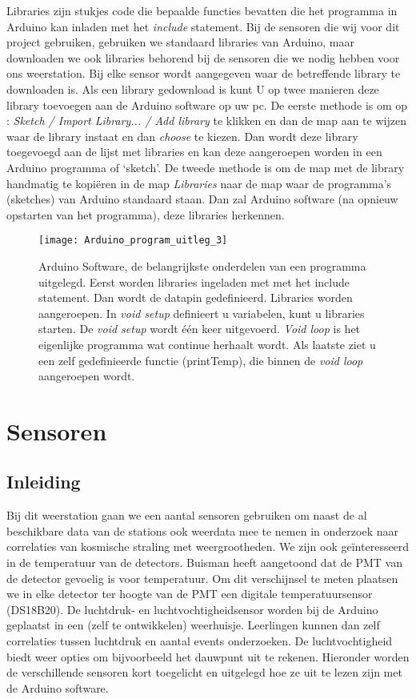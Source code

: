 Libraries zijn stukjes code die bepaalde functies bevatten die het
programma in Arduino kan inladen met het \emph{include} statement. Bij
de sensoren die wij voor dit project gebruiken, gebruiken we standaard
libraries van Arduino, maar downloaden we ook libraries behorend bij de
sensoren die we nodig hebben voor ons weerstation. Bij elke sensor wordt
aangegeven waar de betreffende library te downloaden is. Als een library
gedownload is kunt U op twee manieren deze library toevoegen aan de
Arduino software op uw pc. De eerste methode is om op : \emph{Sketch /
Import Library... / Add library} te klikken en dan de map aan te wijzen
waar de library instaat en dan \emph{choose} te kiezen. Dan wordt deze
library toegevoegd aan de lijst met libraries en kan deze aangeroepen
worden in een Arduino programma of `sketch'. De tweede methode is om de
map met de library handmatig te kopi\"{e}ren in de map \emph{Libraries}
naar de map waar de programma's (sketches) van Arduino standaard staan.
Dan zal Arduino software (na opnieuw opstarten van het programma), deze 
libraries herkennen. 


\begin{figure}
    \centering
    \texttt{[image: Arduino\_program\_uitleg\_3]}
    \caption{Arduino Software, de belangrijkste onderdelen van een 
    programma uitgelegd. Eerst worden libraries ingeladen met 
    met het include statement. Dan wordt de datapin gedefinieerd.
    Libraries worden aangeroepen. In \emph{void setup} definieert u variabelen, 
    kunt u libraries starten. De \emph{void setup} wordt één keer uitgevoerd. 
    \emph{Void loop} is het eigenlijke programma wat continue herhaalt wordt. 
    Als laatste ziet u een zelf gedefinieerde functie (printTemp), die binnen 
    de \emph{void loop} aangeroepen wordt.}
   \label{fig:Arduino_program_uitleg_3}
\end{figure}


\section{Sensoren}

\subsection{Inleiding}

Bij dit weerstation gaan we een aantal sensoren gebruiken om naast de al
beschikbare data van de \hisparc stations ook weerdata mee te nemen in
onderzoek naar correlaties van kosmische straling met weergrootheden. We
zijn ook ge\"{i}nteresseerd in de temperatuur van de detectors.
Buisman \cite{Buisman} heeft aangetoond dat de PMT van de detector gevoelig is
voor temperatuur. Om dit verschijnsel te meten plaatsen we in elke detector 
ter hoogte van de PMT een digitale temperatuursensor (DS18B20). De luchtdruk- 
en luchtvochtigheidsensor worden bij de Arduino geplaatst in een (zelf te
ontwikkelen) weerhuisje. Leerlingen kunnen dan zelf correlaties tussen
luchtdruk en aantal events onderzoeken. De luchtvochtigheid biedt weer
opties om bijvoorbeeld het dauwpunt uit te rekenen. Hieronder worden de
verschillende sensoren kort toegelicht en uitgelegd hoe ze uit te lezen
zijn met de Arduino software. 


